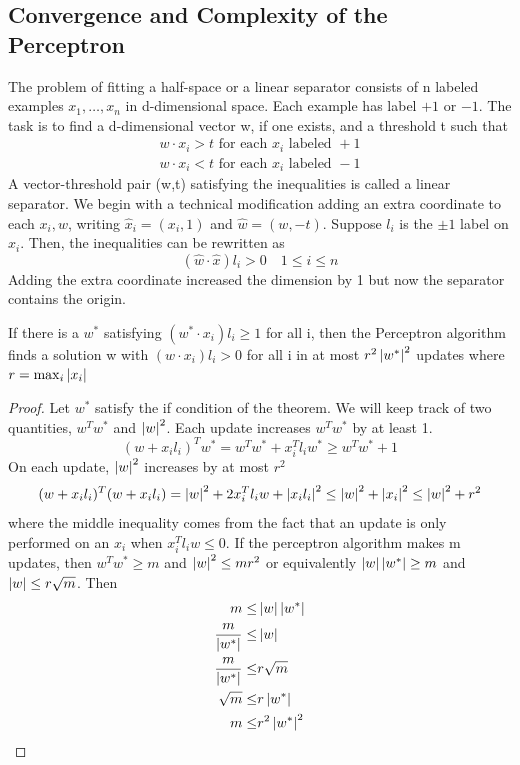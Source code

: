\subsection{Convergence and Complexity of the Perceptron}
The problem of fitting a half-space or a linear separator consists of n labeled examples $x_{1}, \ldots,x_{n}$ in d-dimensional space. Each example has label $+1$ or $-1$. The task is to find a d-dimensional vector w, if one exists, and a threshold t such that
\begin{align*}
    w\cdot x_i > t \text{ for each } x_i \text{ labeled }+1\\
    w\cdot x_i < t \text{ for each } x_i \text{ labeled }-1
\end{align*}
A vector-threshold pair (w,t) satisfying the inequalities is called a linear separator. We begin with a technical modification adding an extra coordinate to each $x_i, w$, writing $\hat{x}_i=(x_i,1)$ and $\hat{w} =(w,-t)$. Suppose $l_i$ is the $\pm 1$ label on $x_i$. Then, the inequalities can be rewritten as 
\[ 
    (\hat{w} \cdot \hat{x})l_i > 0 \quad 1 \leq i \leq n 
\]
Adding the extra coordinate increased the dimension by 1 but now the separator contains the origin.
\begin{theorem}
    If there is a $w^*$ satisfying $(w^*\cdot x_i)l_i\geq 1$ for all i, then the Perceptron algorithm finds a solution w with $(w\cdot x_i)l_i >0$ for all i in at most $r^2\left\lvert w^*\right\rvert^2$ updates where $r = \max_{i}{\left\lvert x_i\right\rvert}$
    \begin{proof}
        Let $w^*$ satisfy the if condition of the theorem. We will keep track of two quantities, $w^Tw^*$ and $\left\lvert w\right\rvert^2$. Each update increases $w^Tw^*$ by at least 1.
        \[ 
            (w+x_il_i)^Tw^* = w^Tw^* + x_i^Tl_iw^* \geq w^Tw^*+1
        \]
        On each update, $\left\lvert w\right\rvert^2$ increases by at most $r^2$
        \[ 
            (w+x_il_i)^T(w+x_il_i) =\left\lvert w\right\rvert^2+ 2x_i^Tl_iw+\left\lvert x_il_i\right\rvert^2 \leq \left\lvert w\right\rvert^2 +\left\lvert x_i\right\rvert^2 \leq \left\lvert w\right\rvert^2+r^2 
        \]
        where the middle inequality comes from the fact that an update is only performed on an $x_i$ when $x_i^Tl_iw\leq 0$. If the perceptron algorithm makes m updates, then $w^Tw^* \geq m$ and $\left\lvert w\right\rvert^2 \leq mr^2$ or equivalently $\left\lvert w\right\rvert\left\lvert w^*\right\rvert\geq m$ and $\left\lvert w\right\rvert \leq r \sqrt{m}$. Then
        \begin{align*}
            m \leq& \left\lvert w\right\rvert\left\lvert w^*\right\rvert \\
            \frac{m}{\left\lvert w^*\right\rvert} \leq& \left\lvert w\right\rvert\\
            \frac{m}{\left\lvert w^*\right\rvert} \leq & r \sqrt{m} \\
            \sqrt{m} \leq & r\left\lvert w^*\right\rvert\\
            m \leq & r^2\left\lvert w^*\right\rvert^2
        \end{align*}
    \end{proof}
\end{theorem}
